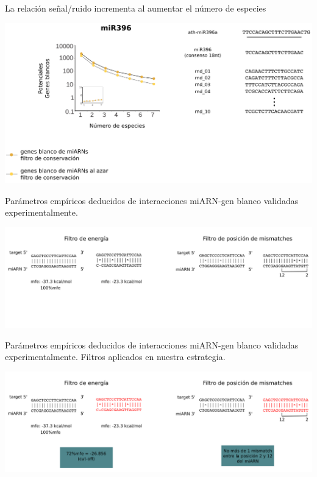 \documentclass{beamer}
\begin{document}
\begin{frame}{La relación señal/ruido incrementa al aumentar el número de especies}
	\begin{center}
		\includegraphics[width=1\textwidth]{img/NAR_fig2_02.png}
	\end{center}
\end{frame}


\begin{frame}{Parámetros empíricos deducidos de interacciones miARN-gen blanco validadas experimentalmente.}
	\begin{center}
		\includegraphics[width=1\textwidth]{img/filtros_empiricos_01.png}
	\end{center}
\end{frame}

\begin{frame}{Parámetros empíricos deducidos de interacciones miARN-gen blanco validadas experimentalmente. Filtros aplicados en nuestra estrategia.}
	\begin{center}
		\includegraphics[width=1\textwidth]{img/filtros_empiricos_02.png}
	\end{center}
\end{frame}
\end{document}
